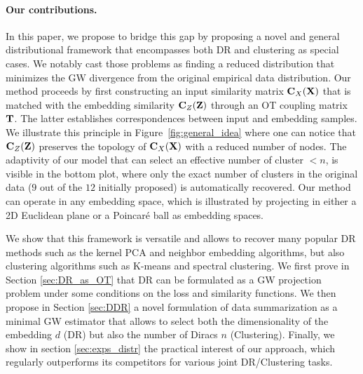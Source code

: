 \paragraph{Our contributions.} In this paper, we propose to bridge this gap by
proposing a novel and general distributional framework that encompasses both DR and clustering
as special cases. We notably cast those problems as finding a reduced distribution that minimizes the GW divergence from the original empirical data distribution.
Our method proceeds by first constructing an input similarity matrix
${\mathbf{C}}_X({\mathbf{X}})$ that is matched with the embedding similarity ${\mathbf{C}}_Z({\mathbf{Z}})$ through
an OT coupling matrix ${\mathbf{T}}$. The latter establishes correspondences between
input and embedding samples. We illustrate this principle in
Figure~\ref{fig:general_idea} where one can notice that ${\mathbf{C}}_Z({\mathbf{Z}})$ preserves
the topology of ${\mathbf{C}}_X({\mathbf{X}})$ with a reduced number of nodes. The adaptivity of
our model that can select an effective number of cluster $<n$, is visible in the
bottom plot, where only the exact number of clusters in the original data ($9$ out of the $12$
initially proposed) is automatically recovered. Our method can operate in any embedding space, which is illustrated by
projecting in either a 2D Euclidean plane or a Poincaré ball as embedding
spaces.

We show that this framework is versatile and allows to recover many popular DR
methods such as the kernel PCA and neighbor embedding algorithms, but also clustering 
algorithms such as K-means and spectral clustering. We first prove in Section
\ref{sec:DR_as_OT} that DR can be formulated as a GW projection problem under
some conditions on the loss and similarity functions. We then propose in Section
\ref{sec:DDR} a novel formulation of data summarization as a minimal GW estimator that allows
to select both the dimensionality of the embedding $d$ (DR) but also the number of Diracs
$n$ (Clustering).
Finally, we show in section \ref{sec:exps_distr} the practical interest of our approach, which regularly outperforms its competitors for various joint DR/Clustering tasks.

